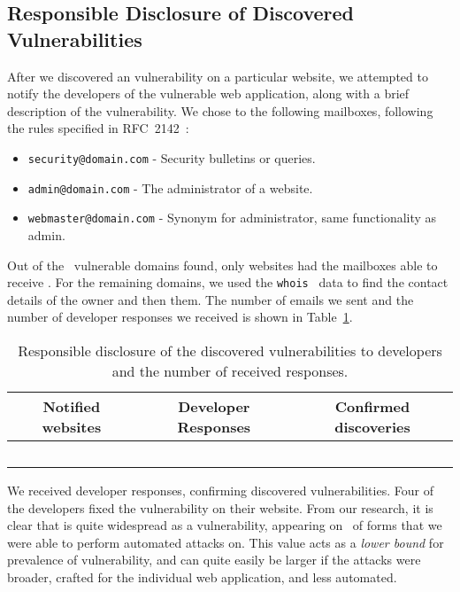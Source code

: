 \subsection{Responsible Disclosure of Discovered Vulnerabilities}
After we discovered an \ehi vulnerability on a particular website, we attempted to notify the developers of the vulnerable web application, along with a brief description of the vulnerability.
We chose to \email the following mailboxes, following the rules specified in RFC~2142~\cite{rfc2142}:
\begin{itemize}
	\item \texttt{security@domain.com} - Security bulletins or queries.
	\item \texttt{admin@domain.com} - The administrator of a website.
	\item \texttt{webmaster@domain.com} - Synonym for administrator, same functionality as admin.
\end{itemize}
 
Out of the \domains\ vulnerable domains found, only \emailedDefaultmailbox websites had the mailboxes able to receive \emails. For the remaining domains, we used the \texttt{whois}~\cite{whois} data to find the contact details of the owner and then \emailed them. The number of emails we sent and the number of developer responses we received is shown in Table~\ref{tab:devresp}.

\begin{table}[tbp]
\centering
\normalsize
\begin{tabular}{|c|c|c|}
	\hline
	\multicolumn{1}{|p{2cm}}{\centering \textbf{Notified websites}} &
	\multicolumn{1}{|p{2cm}|}{\centering \textbf{Developer Responses}} &
	\multicolumn{1}{p{2cm}|}{\centering \textbf{Confirmed discoveries}}\\
	\hline
	\domains\ & \responses & \confirmed \\
	\hline
\end{tabular}
	\caption[\titlecap{}]{Responsible disclosure of the discovered vulnerabilities to developers and the number of received responses.}
	\label{tab:devresp}
\end{table}

We received \responses developer responses, confirming \confirmed discovered vulnerabilities. Four of the developers fixed the vulnerability on their website.
From our research, it is clear that \ehi is quite widespread as a vulnerability, appearing on \successDelta\ of forms that we were able to perform automated attacks on. This value acts as a \emph{lower bound} for prevalence of \ehi vulnerability, and can quite easily be larger if the attacks were broader, crafted for the individual web application, and  less automated. 
